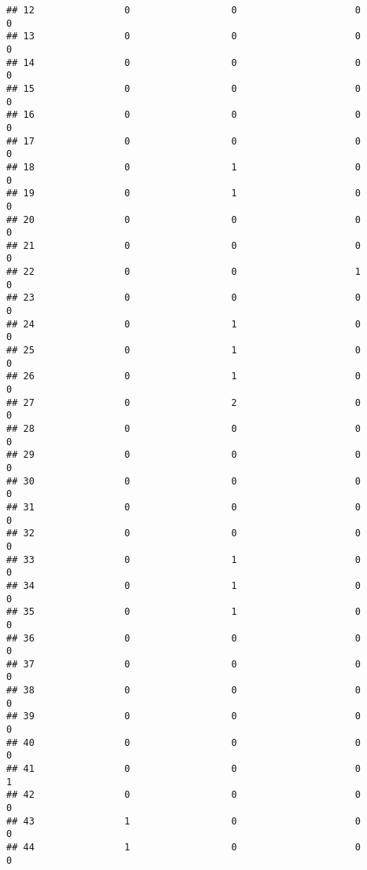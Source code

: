 \documentclass[
]{article}
\begin{document}
\begin{verbatim}
## 12                0                  0                     0               0
## 13                0                  0                     0               0
## 14                0                  0                     0               0
## 15                0                  0                     0               0
## 16                0                  0                     0               0
## 17                0                  0                     0               0
## 18                0                  1                     0               0
## 19                0                  1                     0               0
## 20                0                  0                     0               0
## 21                0                  0                     0               0
## 22                0                  0                     1               0
## 23                0                  0                     0               0
## 24                0                  1                     0               0
## 25                0                  1                     0               0
## 26                0                  1                     0               0
## 27                0                  2                     0               0
## 28                0                  0                     0               0
## 29                0                  0                     0               0
## 30                0                  0                     0               0
## 31                0                  0                     0               0
## 32                0                  0                     0               0
## 33                0                  1                     0               0
## 34                0                  1                     0               0
## 35                0                  1                     0               0
## 36                0                  0                     0               0
## 37                0                  0                     0               0
## 38                0                  0                     0               0
## 39                0                  0                     0               0
## 40                0                  0                     0               0
## 41                0                  0                     0               1
## 42                0                  0                     0               0
## 43                1                  0                     0               0
## 44                1                  0                     0               0

\end{verbatim}
\end{document}
